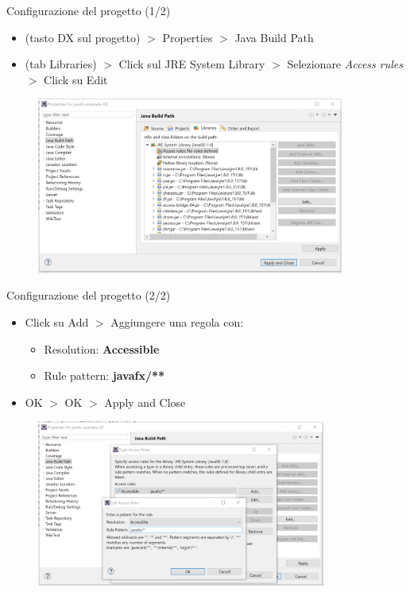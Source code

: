 \documentclass[presentation]{beamer}
\begin{document}
\begin{frame}{Configurazione del progetto (1/2)}
\begin{itemize}
\item (tasto DX sul progetto) $>$ Properties $>$ Java Build Path
\item (tab Libraries) $>$ Click sul JRE System Library $>$ Selezionare \textit{Access rules} $>$ Click su Edit
\end{itemize}
\begin{figure}
\includegraphics[width=0.9\textwidth]{img/conf01.png}
\end{figure}
\end{frame}

\begin{frame}{Configurazione del progetto (2/2)}
\begin{itemize}
\item Click su Add $>$ Aggiungere una regola con:
\begin{itemize}
\item Resolution: \textbf{Accessible}
\item Rule pattern: \textbf{javafx/**}
\end{itemize}
\item OK $>$ OK $>$ Apply and Close 
\end{itemize}
\begin{figure}
\includegraphics[width=0.85\textwidth]{img/conf02.png}
\end{figure}
\end{frame}
\end{document}
